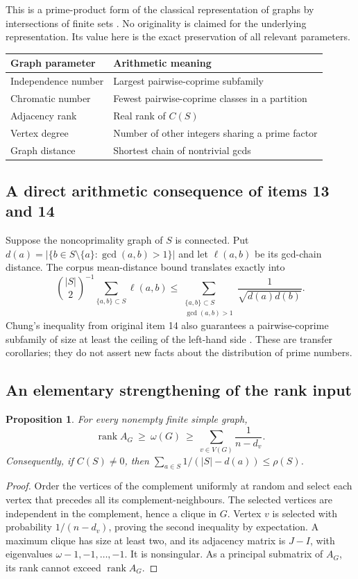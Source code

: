 \documentclass[11pt,a4paper]{article}
\newtheorem{proposition}[theorem]{Proposition}
\theoremstyle{definition}
\theoremstyle{remark}
\DeclareMathOperator{\rank}{rank}
\numberwithin{equation}{section}
\begin{document}
This is a prime-product form of the classical representation of graphs
by intersections of finite sets \cite{egp}. No originality is claimed
for the underlying representation. Its value here is the exact
preservation of all relevant parameters.

\begin{center}\small
\begin{tabularx}{\linewidth}{@{}lX@{}}
\toprule
Graph parameter & Arithmetic meaning\\
\midrule
Independence number & Largest pairwise-coprime subfamily\\
Chromatic number & Fewest pairwise-coprime classes in a partition\\
Adjacency rank & Real rank of $C(S)$\\
Vertex degree & Number of other integers sharing a prime factor\\
Graph distance & Shortest chain of nontrivial gcds\\
\bottomrule
\end{tabularx}
\end{center}

\subsection{A direct arithmetic consequence of items 13 and 14}

Suppose the noncoprimality graph of $S$ is connected. Put
$d(a)=|\{b\in S\setminus\{a\}:\gcd(a,b)>1\}|$ and let
$\ell(a,b)$ be its gcd-chain distance. The corpus mean-distance bound
translates exactly into
\[
\binom{|S|}{2}^{-1}\sum_{\{a,b\}\subset S}\ell(a,b)
\le
\sum_{\substack{\{a,b\}\subset S\\\gcd(a,b)>1}}
\frac1{\sqrt{d(a)d(b)}}.
\]
Chung's inequality from original item 14 also guarantees a
pairwise-coprime subfamily of size at least the ceiling of the
left-hand side \cite{fajtlowicz}.
These are transfer corollaries; they do not assert new facts about
the distribution of prime numbers.

\subsection{An elementary strengthening of the rank input}

\begin{proposition}\label{prop:rank-density}
For every nonempty finite simple graph,
\[
\rank A_G\ \ge\ \omega(G)\
\ge\ \sum_{v\in V(G)}\frac1{n-d_v}.
\]
Consequently, if $C(S)\ne0$, then
$\sum_{a\in S}1/(|S|-d(a))\le\rho(S)$.
\end{proposition}
\begin{proof}
Order the vertices of the complement uniformly at random and select
each vertex that precedes all its complement-neighbours.
The selected vertices are independent in the complement, hence a
clique in $G$. Vertex $v$ is selected with probability
$1/(n-d_v)$, proving the second inequality by expectation.
A maximum clique has size at least two, and its adjacency matrix is
$J-I$, with eigenvalues $\omega-1,-1,\ldots,-1$. It is nonsingular.
As a principal submatrix of $A_G$, its rank cannot exceed $\rank A_G$.
\end{proof}
\end{document}
